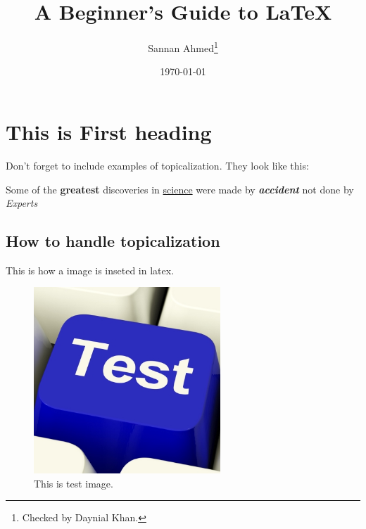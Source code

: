 \documentclass[12pt, A4]{article} %
\title{A Beginner's Guide to \LaTeX}
\author{Sannan Ahmed\thanks{Checked by Daynial Khan.}}
\date{\today} %
\begin{document}


\begin{titlepage}
\maketitle
\thispagestyle{empty} %
\end{titlepage}


\tableofcontents
\newpage

\section{This is First heading}

Don't forget to include examples of topicalization.
They look like this:

Some of the \textbf{greatest}  
discoveries in \underline{science} 
were made by \textbf{\textit{accident}}
not done by \emph{Experts}
\subsection{How to handle topicalization}
This is how a image is inseted in latex.

\begin{figure}[!htb] %
	\centering
	\includegraphics[width=7cm]{avatar} 
	\caption{This is test image.}
\end{figure}
\end{document}
